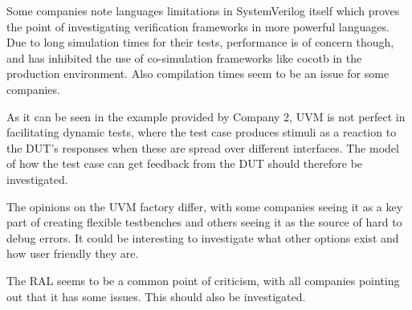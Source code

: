 Some companies note languages limitations in SystemVerilog itself which proves the point of investigating
verification frameworks in more powerful languages. Due to long simulation times for their tests, performance is of
concern though, and has inhibited the use of co-simulation frameworks like cocotb in the production environment. Also
compilation times seem to be an issue for some companies.

As it can be seen in the example provided by Company 2, UVM is not perfect in facilitating dynamic tests, where the
test case produces stimuli as a reaction to the DUT's responses when these are spread over different interfaces. The
model of how the test case can get feedback from the DUT should therefore be investigated.

The opinions on the UVM factory differ, with some companies seeing it as a key part of creating flexible testbenches
and others seeing it as the source of hard to debug errors. It could be interesting to investigate what other options
exist and how user friendly they are.

The RAL seems to be a common point of criticism, with all companies pointing out that it has some issues. This should
also be investigated.

